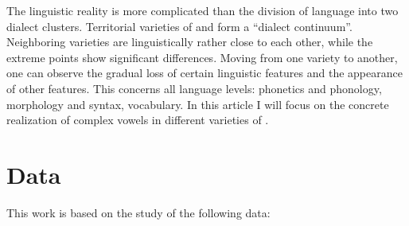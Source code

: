 \documentclass[output=paper,colorlinks,citecolor=brown]{langscibook}
\begin{document}
The linguistic reality is more complicated than the division of language into two dialect clusters. Territorial varieties of  and  form a “dialect continuum”. Neighboring varieties are linguistically rather close to each other, while the extreme points show significant differences. Moving from one variety to another, one can observe the gradual loss of certain linguistic features and the appearance of other features. This concerns all language levels: phonetics and phonology, morphology and syntax, vocabulary. In this article I will focus on the concrete realization of complex vowels in different varieties of .

\section{Data}

This work is based on the study of the following data:
\end{document}
